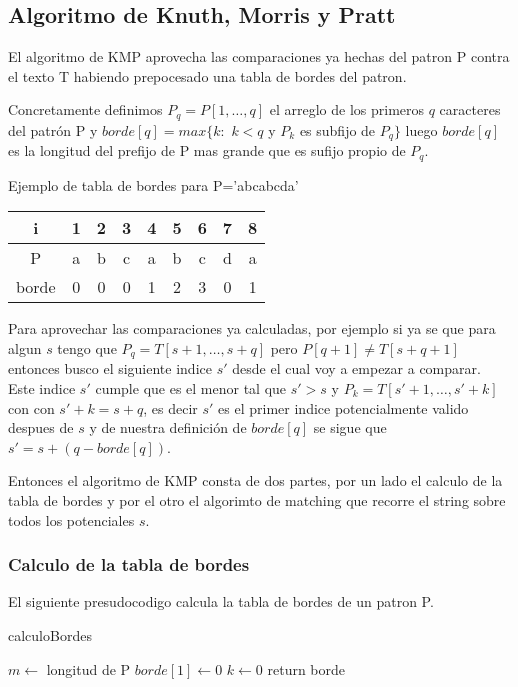 \subsection{Algoritmo de Knuth, Morris y Pratt}
	El algoritmo de KMP aprovecha las comparaciones ya hechas del patron
	P contra el texto T habiendo prepocesado una tabla de bordes del 
	patron. 
	
	
	Concretamente definimos $P_q=P[1,\dots ,q]$ el arreglo
	de los primeros $q$ caracteres del patr\'on P y 
	$borde[q]=max\{k:$ $k<q$ y $P_k$ es subfijo de $P_q\}$ luego $borde[q]$ es la 
	longitud del prefijo de P mas grande que es sufijo propio de $P_q$.
	
	
	Ejemplo de tabla de bordes para P='abcabcda'
	
	
	\begin{table}[h]
		\centering
		\begin{tabular}[h]{|c|c |c |c |c |c |c |c |c |}
			\hline
			i & 1 & 2 & 3 & 4 & 5 & 6 & 7 & 8\\ \hline
			P & a &b&c&a&b&c&d&a \\ \hline
			borde & 0& 0& 0& 1& 2 &3& 0& 1 \\ \hline
		\end{tabular}
	\end{table}
	
	
	Para aprovechar las comparaciones ya calculadas, por ejemplo si ya
	se que para algun $s$ tengo que $P_q=T[s+1,\dots ,s+q]$ pero $P[q+1]\neq T[s+q+1]$ 
	entonces busco el siguiente indice $s'$ desde el cual voy a empezar a comparar. 
	Este indice $s'$ cumple que es el menor tal que $s'>s$ y $P_k=T[s'+1,\dots ,s'+k]$ con
	con $s'+k=s+q$, es decir $s'$ es el primer indice potencialmente valido despues de $s$ y
	de nuestra definici\'on de $borde[q]$ se sigue que $s'=s+(q-borde[q])$.
	
	Entonces el algoritmo de KMP consta de dos partes, por un lado el 
	calculo de la tabla de bordes y por el otro el algorimto de matching
	que recorre el string sobre todos los potenciales $s$.
	
	\subsubsection{Calculo de la tabla de bordes}
	El siguiente presudocodigo calcula la tabla de bordes de un patron P.
	
	\begin{algorithm}
	\caption{calculoBordes}
	\BlankLine

	$m\leftarrow$ longitud de P\;
	$borde[1] \leftarrow 0$\;
	$k\leftarrow 0$\;
	return borde\;
	\end{algorithm}

